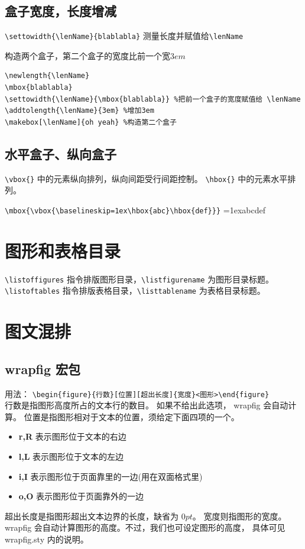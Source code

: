 \documentclass[a4paper,11pt]{article}
\begin{document}
\subsection{盒子宽度，长度增减}
\verb+\settowidth{\lenName}{blablabla}+ 测量长度并赋值给\verb+\lenName+

构造两个盒子，第二个盒子的宽度比前一个宽$3em$
\begin{Verbatim}
\newlength{\lenName}
\mbox{blablabla}
\settowidth{\lenName}{\mbox{blablabla}} %把前一个盒子的宽度赋值给 \lenName
\addtolength{\lenName}{3em} %增加3em
\makebox[\lenName]{oh yeah} %构造第二个盒子
\end{Verbatim}

\subsection{水平盒子、纵向盒子}
\verb+\vbox{}+ 中的元素纵向排列，纵向间距受行间距控制。
\verb+\hbox{}+ 中的元素水平排列。

\verb+\mbox{\vbox{\baselineskip=1ex\hbox{abc}\hbox{def}}}+\hspace{2em}
\mbox{\vbox{\baselineskip=1ex\hbox{abc}\hbox{def}}}


\section{图形和表格目录}
\verb+\listoffigures+ 指令排版图形目录，\verb+\listfigurename+
为图形目录标题。\\
\verb+\listoftables+ 指令排版表格目录，\verb+\listtablename+
为表格目录标题。

\section{图文混排}
\subsection{wrapfig 宏包}
用法：%
\verb+\begin{figure}{行数}[位置][超出长度]{宽度}<图形>\end{figure}+\\
行数是指图形高度所占的文本行的数目。 如果不给出此选项，
wrapfig 会自动计算。 位置是指图形相对于文本的位置，须给定下面四项的一个。
\begin{itemize}
	\item {\bf r,R} 表示图形位于文本的右边
	\item {\bf l,L} 表示图形位于文本的左边
	\item {\bf i,I} 表示图形位于页面靠里的一边(用在双面格式里)
	\item {\bf o,O} 表示图形位于页面靠外的一边
\end{itemize}
超出长度是指图形超出文本边界的长度，缺省为 $0pt$。 宽度则指图形的宽度。
wrapfig 会自动计算图形的高度。不过，我们也可设定图形的高度，
具体可见 wrapfig.sty 内的说明。
\end{document}
